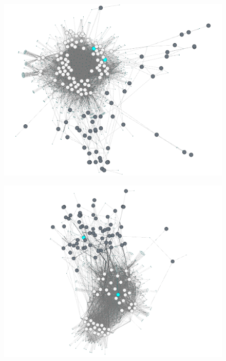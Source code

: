 \begin{landscape}
\begin{figure}
\begin{center}
\begin{minipage}[t]{0.40\textwidth}
\includegraphics[width=\textwidth]{./img/BCF.png}
\label{figbact}
\end{minipage}
\begin{minipage}[t]{0.40\textwidth}
\includegraphics[width=\textwidth]{./img/cyano.png}
\label{figcyano}
\end{minipage}
\begin{minipage}[t]{0.40\textwidth}

\end{minipage}
\end{center}
\end{figure}
\end{landscape}
